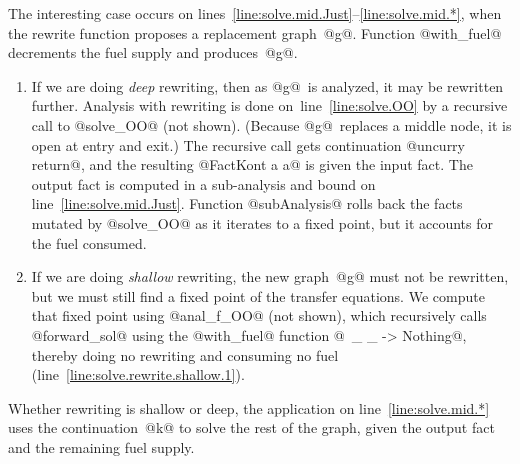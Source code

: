 \documentclass[blockstyle,preprint,natbib,nocopyrightspace]{sigplanconf}
\newcommand\lineref[1]{line~\ref{line:#1}}
\newcommand\linerangeref[2]{\mbox{lines~\ref{line:#1}--\ref{line:#2}}}
\def\authornote#1{\unskip\relax}
\newcommand{\simon}[1]{\authornote{SLPJ: #1}}
\newcommand{\john}[1]{\authornote{JD: #1}}
\begin{document}
The interesting case occurs on \linerangeref{solve.mid.Just}{solve.mid.*},
when the rewrite function 
proposes a replacement graph~@g@.
Function @with_fuel@ decrements the fuel supply and produces~@g@.
\begin{enumerate}
\item
If we are doing \emph{deep} rewriting, then as @g@~is analyzed,
it may be rewritten further.
Analysis with rewriting is done
on~\lineref{solve.OO}
by a recursive call to @solve_OO@ (not shown).
(Because @g@~replaces a middle node, it is open at entry and exit.)
The recursive call gets continuation @uncurry return@,\john{Which one is wrong here: text or figure?} and the
resulting @FactKont a a@ is given
the input fact.
The output fact is computed in a sub-analysis
and bound on
\lineref{solve.mid.Just}. 
%
Function @subAnalysis@ rolls back the facts mutated
by @solve_OO@ as it iterates to a fixed point, but it accounts for
the fuel consumed.
\item
If we are doing \emph{shallow} rewriting,  the new graph~@g@ must not be
rewritten, but we must still find a fixed point of the transfer
equations.
We compute that fixed point using @anal_f_OO@ (not shown), which  recursively calls
@forward_sol@ using the @with_fuel@ function
@\ _ _ -> Nothing@, 
thereby doing no rewriting and consuming no fuel
(\lineref{solve.rewrite.shallow.1}).
\simon{This business of passing in a different @with\_fuel@ seems terribly
clumsy to me.  The obvious thing would be to add a third constructor \texttt{NoRewrite}
to the @RewritingDepth@ type, so that we could call @forward\_sol@ saying
``don't do any rewriting at all''.  Would that even elimiate the higher order
@with\_fuel@ parameter altogether?  What is it used for? 
NR:~If you re-examine the structure of the case expressions, you'll
see that \texttt{NoRewrite} as a third constructor would leave to
inexhaustive pattern matching.  A Boolean would do.
Function @with\_fuel@ is also
used to decrement the fuel supply.
Combining the decrement with the test in a higher-order function
simplified the code significantly (and made it impossible to forget to
decrement).
}
%
\end{enumerate}
Whether rewriting is shallow or deep, the application on
\lineref{solve.mid.*} uses the continuation~@k@ to solve the rest of
the graph, given the output fact and the remaining fuel supply.
\end{document}
